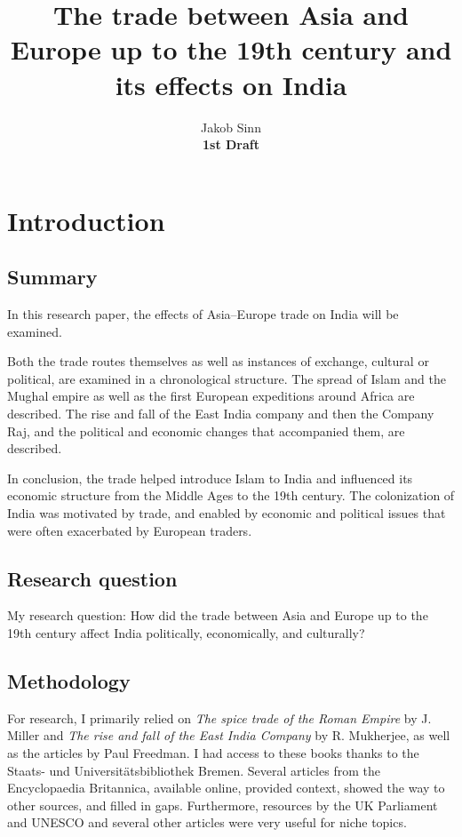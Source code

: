 \documentclass[11pt, a4paper, headings=standardclasses]{scrartcl}
\begin{document}
\renewcommand{\baselinestretch}{1.5}
\subject{Facharbeit}
\author{Jakob Sinn \\ \textbf{1st Draft}}
\title{The trade between Asia and Europe up to the 19th century and its effects on India}
\maketitle
\thispagestyle{empty}
\clearpage
{}
\tableofcontents
\clearpage
\section{Introduction}
\subsection{Summary}
In this research paper, the effects of Asia--Europe trade on India will be examined.

Both the trade routes themselves as well as instances of exchange, cultural or political, are examined in a chronological structure. The spread of Islam and the Mughal empire as well as the first European expeditions around Africa are described. The rise and fall of the East India company and then the Company Raj, and the political and economic changes that accompanied them, are described.

In conclusion, the trade helped introduce Islam to India and influenced its economic structure from the Middle Ages to the 19th century. The colonization of India was motivated by trade, and enabled by economic and political issues that were often exacerbated by European traders.
\subsection{Research question}
My research question: How did the trade between Asia and Europe up to the 19th century affect India politically, economically, and culturally?
\subsection{Methodology}

For research, I primarily relied on \textit{The spice trade of the Roman Empire} by J. Miller and \textit{The rise and fall of the East India Company} by R. Mukherjee, as well as the articles by Paul Freedman. I had access to these books thanks to the Staats- und Universitätsbibliothek Bremen. Several articles from the Encyclopaedia Britannica, available online, provided context, showed the way to other sources, and filled in gaps. Furthermore, resources by the UK Parliament and UNESCO and several other articles were very useful for niche topics.
\end{document}
